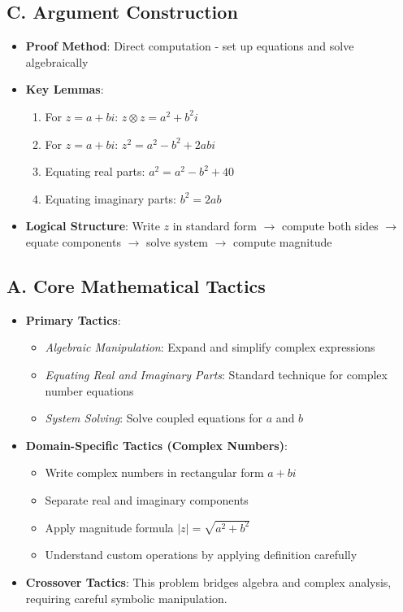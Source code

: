 \documentclass[12pt]{article}
\begin{document}
\begin{strategicbox}
\subsection*{C. Argument Construction}
\begin{itemize}[leftmargin=*]
    \item \textbf{Proof Method}: Direct computation - set up equations and solve algebraically
    \item \textbf{Key Lemmas}: 
    \begin{enumerate}
        \item For $z = a+bi$: $z \otimes z = a^2 + b^2i$
        \item For $z = a+bi$: $z^2 = a^2 - b^2 + 2abi$
        \item Equating real parts: $a^2 = a^2 - b^2 + 40$
        \item Equating imaginary parts: $b^2 = 2ab$
    \end{enumerate}
    \item \textbf{Logical Structure}: Write $z$ in standard form $\to$ compute both sides $\to$ equate components $\to$ solve system $\to$ compute magnitude
\end{itemize}
\end{strategicbox}

\begin{tacticalbox}
\subsection*{A. Core Mathematical Tactics}
\begin{itemize}[leftmargin=*]
    \item \textbf{Primary Tactics}: 
    \begin{itemize}
        \item \emph{Algebraic Manipulation}: Expand and simplify complex expressions
        \item \emph{Equating Real and Imaginary Parts}: Standard technique for complex number equations
        \item \emph{System Solving}: Solve coupled equations for $a$ and $b$
    \end{itemize}
    \item \textbf{Domain-Specific Tactics (Complex Numbers)}: 
    \begin{itemize}
        \item Write complex numbers in rectangular form $a+bi$
        \item Separate real and imaginary components
        \item Apply magnitude formula $|z| = \sqrt{a^2+b^2}$
        \item Understand custom operations by applying definition carefully
    \end{itemize}
    \item \textbf{Crossover Tactics}: This problem bridges algebra and complex analysis, requiring careful symbolic manipulation.
\end{itemize}
\end{tacticalbox}
\end{document}
